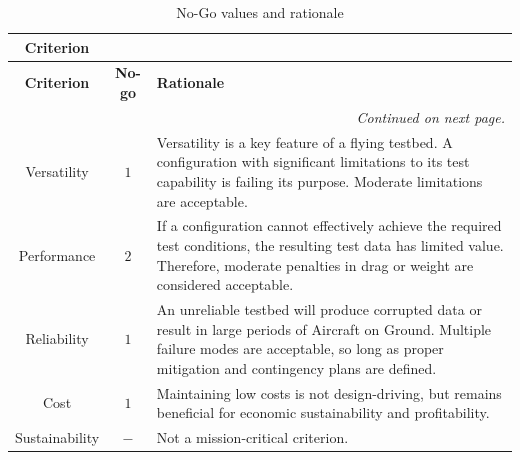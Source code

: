 \begin{longtable}{|c|c|p{13cm}|}
\caption{No-Go values and rationale}
\label{tab:no-go} \\

\hline
\textbf{Criterion} & \centering{\textbf{No-go}} & \centering{\textbf{Rationale}} \tabularnewline
\hline\hline
\endfirsthead

\hline
\textbf{Criterion} & \textbf{No-go} & \textbf{Rationale} \\
\hline\hline
\endhead

\hline
\multicolumn{3}{r}{\textit{Continued on next page.}} \\
\endfoot

\hline
\endlastfoot


Versatility & $1$ &
Versatility is a key feature of a flying testbed. A configuration with significant limitations to its test capability is failing its purpose. Moderate limitations are acceptable.
\\ \hline

Performance & $2$ &
If a configuration cannot effectively achieve the required test conditions, the resulting test data has limited value. Therefore, moderate penalties in drag or weight are considered acceptable.
\\ \hline

Reliability & $1$ &
An unreliable testbed will produce corrupted data or result in large periods of Aircraft on Ground. Multiple failure modes are acceptable, so long as proper mitigation and contingency plans are defined.
\\ \hline

Cost & $1$ &
Maintaining low costs is not design-driving, but remains beneficial for economic sustainability and profitability.
\\ \hline

Sustainability & $-$ &
Not a mission-critical criterion.
\\
\end{longtable}


